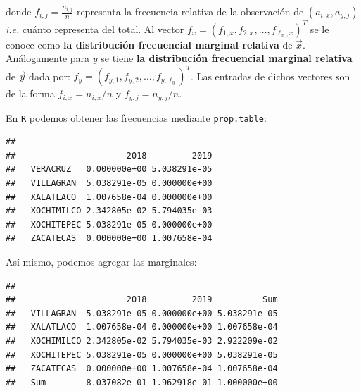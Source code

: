 \documentclass[
]{book}
\newenvironment{Shaded}{\begin{snugshade}}{\end{snugshade}}
\newcommand{\FunctionTok}[1]{\textcolor[rgb]{0.00,0.00,0.00}{#1}}
\newcommand{\NormalTok}[1]{#1}
\newcommand{\SpecialCharTok}[1]{\textcolor[rgb]{0.00,0.00,0.00}{#1}}
\begin{document}
donde \(f_{i,j} = \frac{n_{i,j}}{n}\) representa la frecuencia relativa de la observación de \((a_{i,x}, a_{y,j})\) \emph{i.e.} cuánto representa del total. Al vector \(f_{x} = (f_{1,x}, f_{2,x}, \dots, f_{\ell_x,x})^T\) se le conoce como \textbf{la distribución frecuencial marginal relativa} de \(\vec{x}\). Análogamente para \(y\) se tiene \textbf{la distribución frecuencial marginal relativa} de \(\vec{y}\) dada por: \(f_{y} = (f_{y,1}, f_{y,2}, \dots, f_{y,\ell_y})^T\). Las entradas de dichos vectores son de la forma \(f_{i,x} = n_{i,x}/n\) y \(f_{y,j} = n_{y,j}/n\).

En \texttt{R} podemos obtener las frecuencias mediante \texttt{prop.table}:

\begin{Shaded}
\end{Shaded}

\begin{verbatim}
##             
##                      2018         2019
##   VERACRUZ   0.000000e+00 5.038291e-05
##   VILLAGRAN  5.038291e-05 0.000000e+00
##   XALATLACO  1.007658e-04 0.000000e+00
##   XOCHIMILCO 2.342805e-02 5.794035e-03
##   XOCHITEPEC 5.038291e-05 0.000000e+00
##   ZACATECAS  0.000000e+00 1.007658e-04
\end{verbatim}

Así mismo, podemos agregar las marginales:

\begin{Shaded}
\end{Shaded}

\begin{verbatim}
##             
##                      2018         2019          Sum
##   VILLAGRAN  5.038291e-05 0.000000e+00 5.038291e-05
##   XALATLACO  1.007658e-04 0.000000e+00 1.007658e-04
##   XOCHIMILCO 2.342805e-02 5.794035e-03 2.922209e-02
##   XOCHITEPEC 5.038291e-05 0.000000e+00 5.038291e-05
##   ZACATECAS  0.000000e+00 1.007658e-04 1.007658e-04
##   Sum        8.037082e-01 1.962918e-01 1.000000e+00
\end{verbatim}
\end{document}
